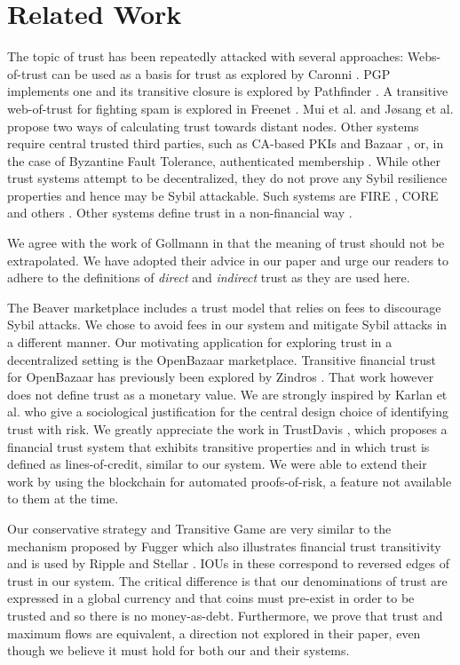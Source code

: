 \section{Related Work}
  The topic of trust has been repeatedly attacked with several approaches: Webs-of-trust can be used as a basis for trust as
  explored by Caronni \cite{wot}. PGP \cite{pgp} implements one and its transitive closure is explored by Pathfinder
  \cite{pathfinder}. A transitive web-of-trust for fighting spam is explored in Freenet \cite{freenet}. Mui et al. \cite{mui}
  and J\o{}sang et al. \cite{beta} propose two ways of calculating trust towards distant nodes. Other systems require
  central trusted third parties, such as CA-based PKIs \cite{pki} and Bazaar \cite{bazaar}, or, in the case of Byzantine Fault
  Tolerance, authenticated membership \cite{byzantine}. While other trust systems attempt to be decentralized, they do not
  prove any Sybil resilience properties and hence may be Sybil attackable. Such systems are FIRE \cite{fire}, CORE \cite{core}
  and others \cite{openrep,ghkkw,rk}. Other systems define trust in a non-financial way \cite{vpc}.

  We agree with the work of Gollmann \cite{badtrust} in that the meaning of trust should not be extrapolated. We have adopted
  their advice in our paper and urge our readers to adhere to the definitions of \textit{direct} and \textit{indirect} trust
  as they are used here.

  The Beaver marketplace \cite{beaver} includes a trust model that relies on fees to discourage Sybil attacks. We chose to
  avoid fees in our system and mitigate Sybil attacks in a different manner. Our motivating application for exploring trust
  in a decentralized setting is the OpenBazaar marketplace. Transitive financial trust for OpenBazaar has previously been
  explored by Zindros \cite{dionyziz}. That work however does not define trust as a monetary value. We are strongly inspired
  by Karlan et al. \cite{kmrs} who give a sociological justification for the central design choice of identifying trust with
  risk. We greatly appreciate the work in TrustDavis \cite{davis}, which proposes a financial trust system that exhibits
  transitive properties and in which trust is defined as lines-of-credit, similar to our system. We were able to extend their
  work by using the blockchain for automated proofs-of-risk, a feature not available to them at the time.

  Our conservative strategy and Transitive Game are very similar to the mechanism proposed by Fugger \cite{iou} which also
  illustrates financial trust transitivity and is used by Ripple \cite{ripple} and Stellar \cite{stellar}. IOUs in these
  correspond to reversed edges of trust in our system. The critical difference is that our denominations of trust are
  expressed in a global currency and that coins must pre-exist in order to be trusted and so there is no money-as-debt.
  Furthermore, we prove that trust and maximum flows are equivalent, a direction not explored in their paper, even though we
  believe it must hold for both our and their systems.
